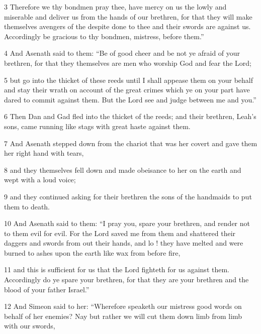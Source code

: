 \par 3 Therefore we thy bondmen pray thee, have mercy on us the lowly and miserable and deliver us from the hands of our brethren, for that they will make themselves avengers of the despite done to thee and their swords are against us. Accordingly be gracious to thy bondmen, mistress, before them.” 

\par 4 And Asenath said to them: “Be of good cheer and be not ye afraid of your brethren, for that they themselves are men who worship God and fear the Lord; 

\par 5 but go into the thicket of these reeds until I shall appease them on your behalf and stay their wrath on account of the great crimes which ye on your part have dared to commit against them. But the Lord see and judge between me and you.”

\par 6 Then Dan and Gad fled into the thicket of the reeds; and their brethren, Leah's sons, came running like stags with great haste against them. 

\par 7 And Asenath stepped down from the chariot that was her covert and gave them her right hand with tears, 

\par 8 and they themselves fell down and made obeisance to her on the earth and wept with a loud voice; 

\par 9 and they continued asking for their brethren the sons of the handmaids to put them to death. 

\par 10 And Asenath said to them: “I pray you, spare your brethren, and render not to them evil for evil. For the Lord saved me from them and shattered their daggers and swords from out their hands, and lo ! they have melted and were burned to ashes upon the earth like wax from before fire, 

\par 11 and this is sufficient for us that the Lord fighteth for us against them. Accordingly do ye spare your brethren, for that they are your brethren and the blood of your father Israel.” 

\par 12 And Simeon said to her: “Wherefore speaketh our mistress good words on behalf of her enemies? Nay but rather we will cut them down limb from limb with our swords, 

